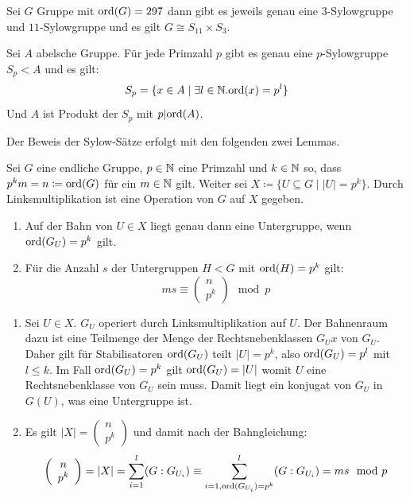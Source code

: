 \begin{beispiel}
  Sei \(G\) Gruppe mit \(\mathrm{ord}(G)=297\) dann gibt es jeweils genau eine \(3\)-Sylowgruppe und \(11\)-Sylowgruppe und es gilt \(G\cong S_{11}\times S_3\).
\end{beispiel}

\begin{korollar}
  Sei \(A\) abelsche Gruppe. Für jede Primzahl \(p\) gibt es genau eine \(p\)-Sylowgruppe \(S_p<A\) und es gilt:
  \[
  S_p=\{x\in A\mid \exists l\in \mathbb{N}.\mathrm{ord}(x)=p^l \}
  \]
  Und \(A\) ist Produkt der \(S_p\) mit \(p|\mathrm{ord}(A)\).
\end{korollar}

Der Beweis der Sylow-Sätze erfolgt mit den folgenden zwei Lemmas.

\begin{lemma}
  Sei \(G\) eine endliche Gruppe, \(p\in\mathbb{N}\) eine Primzahl und \(k\in \mathbb{N}\) so,
  dass \(p^km=n\coloneq\mathrm{ord}(G)\) für ein \(m\in\mathbb{N}\) gilt.
  Weiter sei \(X\coloneq \{U\subseteq G\mid |U|=p^k\}\).
  Durch Linksmultiplikation ist eine Operation von \(G\) auf \(X\) gegeben.
  \begin{enumerate}
  \item Auf der Bahn von \(U\in X\) liegt genau dann eine Untergruppe, wenn \(\mathrm{ord}(G_U)=p^k\) gilt.
  \item Für die Anzahl \(s\) der Untergruppen \(H<G\) mit \(\mathrm{ord}(H)=p^k\) gilt:
  \[ ms\equiv
  \left(
  \begin{array}{c}
    n \\
    p^k
  \end{array}
  \right)
  \mod p
  \]
  \end{enumerate}
\end{lemma}


\begin{beweis}
  \begin{enumerate}
  \item Sei \(U\in X\).
    \(G_U\) operiert durch Linksmultiplikation auf \(U\).
    Der Bahnenraum dazu ist eine Teilmenge der Menge der Rechtsnebenklassen \(G_Ux\) von \(G_U\).
    Daher gilt für Stabilisatoren \(\mathrm{ord}(G_U)\) teilt \(|U|=p^k\), also \(\mathrm{ord}(G_U)=p^l\) mit \(l\leq k\).
    Im Fall \(\mathrm{ord}(G_U)=p^k\) gilt \(\mathrm{ord}(G_U)=|U|\) womit \(U\) eine Rechtsnebenklasse von \(G_U\) sein muss. Damit liegt ein konjugat von \(G_U\) in \(G(U)\), was eine Untergruppe ist.
  \item Es gilt \(|X|=\left(
  \begin{array}{c}
    n \\
    p^k
  \end{array}
  \right)\) und damit nach der Bahngleichung:
  \[
  \left(
  \begin{array}{c}
    n \\
    p^k
  \end{array}
  \right)=|X|=\sum_{i=1}^l (G : G_{U_i})\equiv \sum_{i=1, \mathrm{ord}(G_{U_i})=p^k}^l(G : G_{U_i})=ms \mod p
  \]
  \end{enumerate}
\end{beweis}

